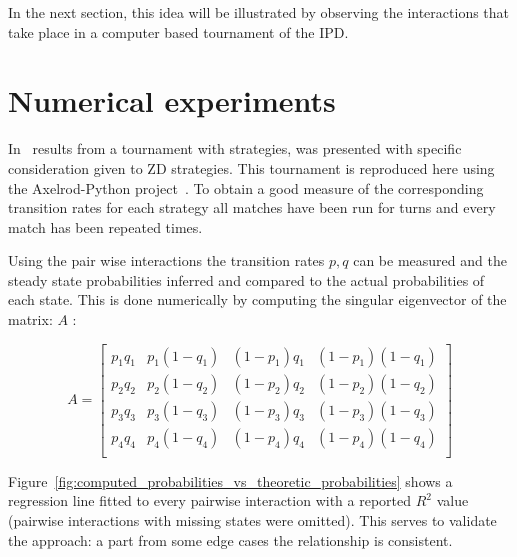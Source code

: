 \documentclass[a4paper]{article}
\begin{document}
In the next section, this idea will be illustrated by observing the interactions
that take place in a computer based tournament of the IPD\@.

\section{Numerical experiments}\label{sec:numerical-experiments}

In~\cite{Stewart2012} results from a tournament with
 strategies,
was presented with specific consideration given to ZD strategies. This
tournament is reproduced here using the Axelrod-Python
project~\cite{Knight2016}. To obtain a good measure of the corresponding
transition rates for each strategy all matches have been run for
 turns and every match has been
repeated  times.

Using the pair wise interactions the transition rates \(p,
q\) can be measured and the steady state probabilities inferred and compared to
the actual probabilities of each state.
This is done numerically by computing the singular eigenvector of the
matrix: \(A\) \cite{Stewart2009}:

\[
    A =
    \begin{bmatrix}
        p_1 q_1 & p_1 (1 - q_1) & (1 - p_1) q_1 & (1 -p_1) (1 - q_1) \\
        p_2 q_2 & p_2 (1 - q_2) & (1 - p_2) q_2 & (1 -p_2) (1 - q_2) \\
        p_3 q_3 & p_3 (1 - q_3) & (1 - p_3) q_3 & (1 -p_3) (1 - q_3) \\
        p_4 q_4 & p_4 (1 - q_4) & (1 - p_4) q_4 & (1 -p_4) (1 - q_4) \\
    \end{bmatrix}
\]

Figure~\ref{fig:computed_probabilities_vs_theoretic_probabilities}
shows a regression line fitted to every pairwise interaction with a reported
\(R^2\) value (pairwise interactions with missing states were omitted). This
serves to validate the approach: a part from some edge cases the relationship is
consistent.
\end{document}
